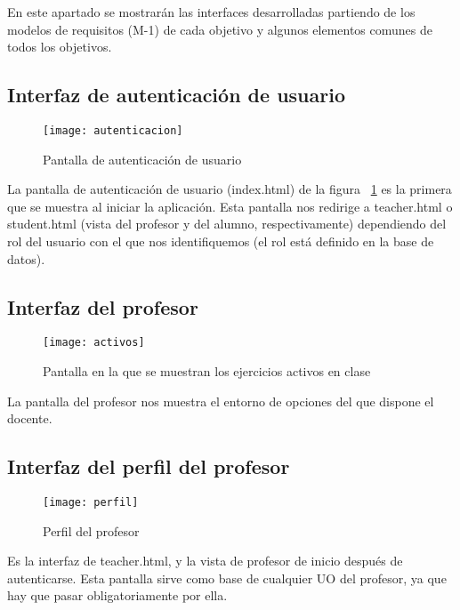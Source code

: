 En este apartado se mostrarán las interfaces desarrolladas partiendo de los modelos de requisitos (M-1) de cada objetivo y algunos elementos comunes de todos los objetivos.

\subsection{Interfaz de autenticación de usuario}
\label{diseno-e-implementacion:interfaces:autenticacion}

\begin{figure}[H]
	\centering
	\texttt{[image: autenticacion]}
	\caption{Pantalla de autenticación de usuario}
	\label{fig:autenticacion}
\end{figure}

La pantalla de autenticación de usuario (index.html) de la figura ~\ref{fig:autenticacion} es la primera que se muestra al iniciar la aplicación. Esta pantalla nos redirige a teacher.html o student.html (vista del profesor y del alumno, respectivamente) dependiendo del rol del usuario con el que nos identifiquemos (el rol está definido en la base de datos).\\

\subsection{Interfaz del profesor}
\label{diseno-e-implementacion:interfaces:profesor}

\begin{figure}[H]
	\centering
	\texttt{[image: activos]}
	\caption{Pantalla en la que se muestran los ejercicios activos en clase}
	\label{fig:activos}
\end{figure}

La pantalla del profesor nos muestra el entorno de opciones del que dispone el docente.\\

\subsection{Interfaz del perfil del profesor}
\label{diseno-e-implementacion:interfaces:perfil}

\begin{figure}[H]
	\centering
	\texttt{[image: perfil]}
	\caption{Perfil del profesor}
	\label{fig:perfil}
\end{figure}

Es la interfaz de teacher.html, y la vista de profesor de inicio después de autenticarse. Esta pantalla sirve como base de cualquier UO del profesor, ya que hay que pasar obligatoriamente por ella.

